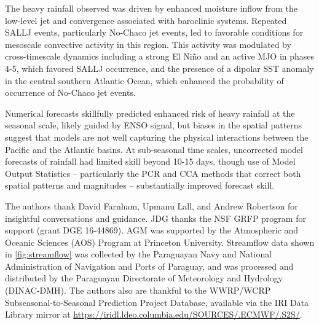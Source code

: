 \documentclass{ametsoc}
\begin{document}
The heavy rainfall observed was driven by enhanced moisture inflow from the low-level jet and convergence associated with baroclinic systems.
Repeated SALLJ events, particularly No-Chaco jet events, led to favorable conditions for mesoscale convective activity in this region.
This activity was modulated by cross-timescale dynamics including a strong El Ni\~{n}o and an active MJO in phases 4-5, which favored SALLJ occurrence, and the presence of a dipolar SST anomaly in the central southern Atlantic Ocean, which enhanced the probability of occurrence of No-Chaco jet events.

Numerical forecasts skillfully predicted enhanced risk of heavy rainfall at the seasonal scale, likely guided by ENSO signal, but biases in the spatial patterns suggest that models are not well capturing the physical interactions between the Pacific and the Atlantic basins.
At sub-seasonal time scales, uncorrected model forecasts of rainfall had limited skill beyond 10-15 days, though use of Model Output Statistics -- particularly the PCR and CCA methods that correct both spatial patterns and magnitudes -- substantially improved forecast skill.


\acknowledgments
The authors thank David Farnham, Upmanu Lall, and Andrew Robertson for insightful conversations and guidance.
JDG thanks the NSF GRFP program for support (grant DGE 16-44869).
AGM was supported by the Atmospheric and Oceanic Sciences (AOS) Program at Princeton University.
Streamflow data shown in \cref{fig:streamflow} was collected by the Paraguayan Navy and National Administration of Navigation and Ports of Paraguay, and was processed and distributed by the Paraguayan Directorate of Meteorology and Hydrology (DINAC-DMH).
The authors also are thankful to the WWRP/WCRP Subseasonal-to-Seasonal Prediction Project Database, available via the IRI Data Library mirror at \url{https://iridl.ldeo.columbia.edu/SOURCES/.ECMWF/.S2S/}.




\end{document}
